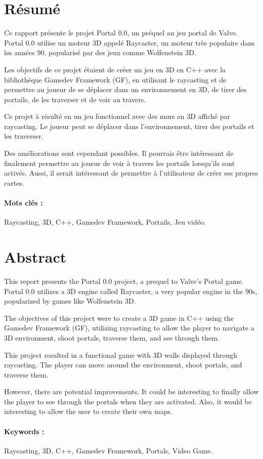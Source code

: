 \documentclass[11pt]{article}
\begin{document}
\newpage





\newpage
\thispagestyle{empty}
\section*{Résumé}
Ce rapport présente le projet Portal 0.0, un préquel au jeu portal de Valve.
Portal 0.0 utilise un moteur 3D appelé Raycaster, un moteur très populaire
dans les années 90, popularisé par des jeux comme Wolfenstein 3D.

Les objectifs de ce projet étaient de créer un jeu en 3D  en C++ avec la bibliothèque
Gamedev Framework (GF), en utilisant le raycasting
et de permettre au joueur de se déplacer dans un environnement en 3D, de tirer des portails,
de les traverser et de voir au travers.

Ce projet à résulté en un jeu fonctionnel avec des murs en 3D 
affiché par raycasting. Le joueur peut se déplacer dans l'environnement,
tirer des portails et les traverser. 

Des améliorations sont cependant possibles. Il pourrais être intéressant
de finalement permettre au joueur de voir à travers les portails 
lorsqu'ils sont activés. Aussi, il serait intéressant de permettre
à l'utilisateur de créer ses propres cartes.

\paragraph{\textbf{Mots clés :}} Raycasting, 3D, C++, Gamedev Framework, Portails, Jeu vidéo.

\hrulefill

\section*{Abstract}
This report presents the Portal 0.0 project, a prequel to Valve's Portal game. Portal 0.0 utilizes a 3D engine called Raycaster, a very popular engine in the 90s, popularized by games like Wolfenstein 3D.

The objectives of this project were to create a 3D game in C++ using the Gamedev Framework (GF), utilizing raycasting to allow the player to navigate a 3D environment, shoot portals, traverse them, and see through them.

This project resulted in a functional game with 3D walls displayed through raycasting. The player can move around the environment, shoot portals, and traverse them.

However, there are potential improvements. It could be interesting to finally allow the player to see through the portals when they are activated. Also, it would be interesting to allow the user to create their own maps.

\paragraph{\textbf{Keywords :}} Raycasting, 3D, C++, Gamedev Framework, Portals, Video Game.
\end{document}
